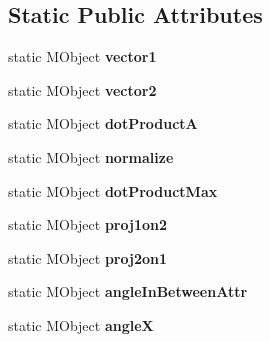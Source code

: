 \subsection*{Static Public Attributes}
\begin{DoxyCompactItemize}
\item 
\hypertarget{class_m_g__dot_product_af502f55718b1cdc9c91daaa9b9d1df56}{static M\-Object {\bfseries vector1}}\label{class_m_g__dot_product_af502f55718b1cdc9c91daaa9b9d1df56}

\item 
\hypertarget{class_m_g__dot_product_a881bce730ab075c01577b70defe1d0e4}{static M\-Object {\bfseries vector2}}\label{class_m_g__dot_product_a881bce730ab075c01577b70defe1d0e4}

\item 
\hypertarget{class_m_g__dot_product_af400962818dc107b87ddf24b8fb85f7a}{static M\-Object {\bfseries dot\-Product\-A}}\label{class_m_g__dot_product_af400962818dc107b87ddf24b8fb85f7a}

\item 
\hypertarget{class_m_g__dot_product_aadac6df0d6b3ed24953710b6a6e1cba8}{static M\-Object {\bfseries normalize}}\label{class_m_g__dot_product_aadac6df0d6b3ed24953710b6a6e1cba8}

\item 
\hypertarget{class_m_g__dot_product_af1b6127de97b79b755c2d61899907d2a}{static M\-Object {\bfseries dot\-Product\-Max}}\label{class_m_g__dot_product_af1b6127de97b79b755c2d61899907d2a}

\item 
\hypertarget{class_m_g__dot_product_a675f64da0eedf32595e29860ff2c5626}{static M\-Object {\bfseries proj1on2}}\label{class_m_g__dot_product_a675f64da0eedf32595e29860ff2c5626}

\item 
\hypertarget{class_m_g__dot_product_aaf6b67d7596461619e1abdbaf0d0119e}{static M\-Object {\bfseries proj2on1}}\label{class_m_g__dot_product_aaf6b67d7596461619e1abdbaf0d0119e}

\item 
\hypertarget{class_m_g__dot_product_a1f5d8e8a523066d3fe0aa19204eb22ce}{static M\-Object {\bfseries angle\-In\-Between\-Attr}}\label{class_m_g__dot_product_a1f5d8e8a523066d3fe0aa19204eb22ce}

\item 
\hypertarget{class_m_g__dot_product_a48e882ea183c7e6b4a8bca37d5054350}{static M\-Object {\bfseries angle\-X}}\label{class_m_g__dot_product_a48e882ea183c7e6b4a8bca37d5054350}


\end{DoxyCompactItemize}
